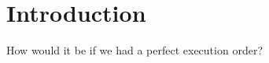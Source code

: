 \chapter{Introduction}\label{chap:introduction}

How would it be if we had a perfect execution order?
